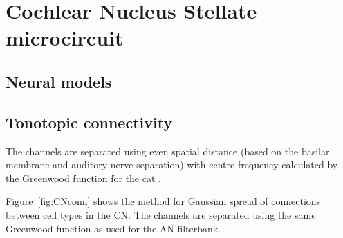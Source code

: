 \smallskip{}





\section{Cochlear Nucleus Stellate microcircuit}\label{sec:CN:cochl-nucl-stell}

\subsection{Neural models}



\smallskip{}

\subsection{Tonotopic connectivity}\label{sec:CN:tonot-conn}

The channels are separated using even spatial distance (based on the
basilar membrane and auditory nerve separation) with centre frequency
calculated by the Greenwood function for the cat
\citep{Greenwood:1990}. 

\smallskip{}

Figure~\ref{fig:CNconn} shows the method for Gaussian spread of
connections between cell types in the CN\@.  The channels are separated
using the same Greenwood function as used for the AN filterbank.


